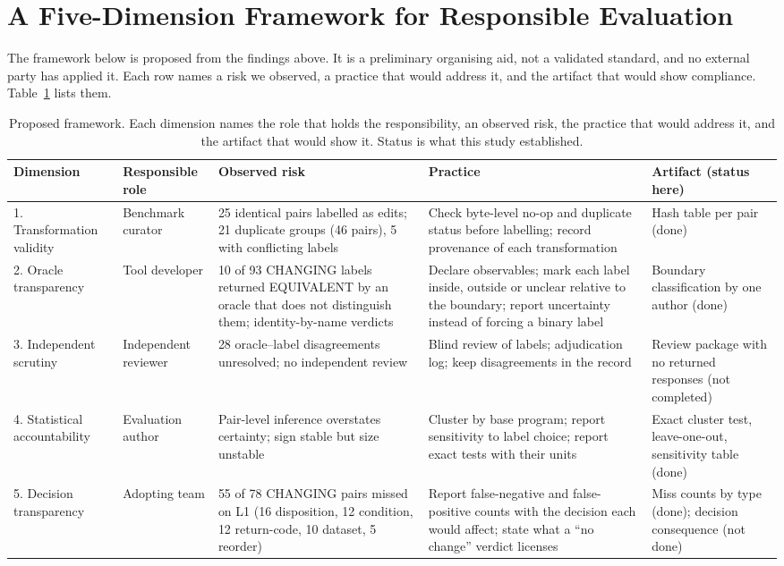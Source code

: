 \documentclass[conference]{IEEEtran}
\begin{document}
\section{A Five-Dimension Framework for Responsible Evaluation}
The framework below is proposed from the findings above. It is a preliminary organising aid, not a validated standard, and no external party has applied it. Each row names a risk we observed, a practice that would address it, and the artifact that would show compliance. Table~\ref{tab:framework} lists them.

\begin{table}[t]
\caption{Proposed framework. Each dimension names the role that holds the responsibility, an observed risk, the practice that would address it, and the artifact that would show it. Status is what this study established.}
\label{tab:framework}
\centering
\small
\begin{tabular}{@{}p{2.2cm}p{2.0cm}p{4.0cm}p{4.0cm}p{3.8cm}@{}}
\toprule
Dimension & Responsible role & Observed risk & Practice & Artifact (status here) \\
\midrule
1. Transformation validity & Benchmark curator & 25 identical pairs labelled as edits; 21 duplicate groups (46 pairs), 5 with conflicting labels & Check byte-level no-op and duplicate status before labelling; record provenance of each transformation & Hash table per pair (done) \\
2. Oracle transparency & Tool developer & 10 of 93 CHANGING labels returned EQUIVALENT by an oracle that does not distinguish them; identity-by-name verdicts & Declare observables; mark each label inside, outside or unclear relative to the boundary; report uncertainty instead of forcing a binary label & Boundary classification by one author (done) \\
3. Independent scrutiny & Independent reviewer & 28 oracle--label disagreements unresolved; no independent review & Blind review of labels; adjudication log; keep disagreements in the record & Review package with no returned responses (not completed) \\
4. Statistical accountability & Evaluation author & Pair-level inference overstates certainty; sign stable but size unstable & Cluster by base program; report sensitivity to label choice; report exact tests with their units & Exact cluster test, leave-one-out, sensitivity table (done) \\
5. Decision transparency & Adopting team & 55 of 78 CHANGING pairs missed on L1 (16 disposition, 12 condition, 12 return-code, 10 dataset, 5 reorder) & Report false-negative and false-positive counts with the decision each would affect; state what a ``no change'' verdict licenses & Miss counts by type (done); decision consequence (not done) \\
\bottomrule
\end{tabular}
\end{table}
\end{document}
